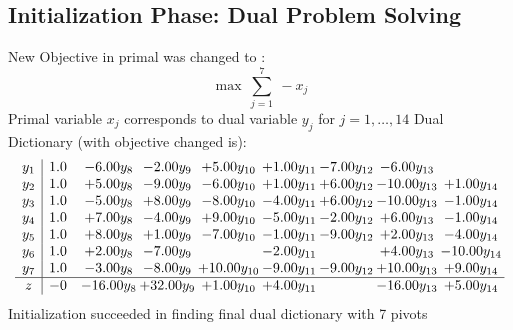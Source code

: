 \documentclass[8pt]{article}
\begin{document}
\subsection{Initialization Phase: Dual Problem Solving}
New Objective in primal was changed to : \[ \max\ \sum_{j=1}^{7}\ - x_j \] 
Primal variable $x_j$ corresponds to dual variable $y_j$ for $j = 1,\ldots,14$
Dual Dictionary (with objective changed is): 
\[\begin{array}{c| c c@{\hskip 2pt} c@{\hskip 2pt} c@{\hskip 2pt} c@{\hskip 2pt} c@{\hskip 2pt} c@{\hskip 2pt} c@{\hskip 2pt} }
 y_{1}   &  1.0 & -6.00 y_{8} & -2.00 y_{9} & +  5.00 y_{10} & +  1.00 y_{11} & -7.00 y_{12} & -6.00 y_{13} &   \\
 y_{2}   &  1.0 & +  5.00 y_{8} & -9.00 y_{9} & -6.00 y_{10} & +  1.00 y_{11} & +  6.00 y_{12} & -10.00 y_{13} & +  1.00 y_{14}\\
 y_{3}   &  1.0 & -5.00 y_{8} & +  8.00 y_{9} & -8.00 y_{10} & -4.00 y_{11} & +  6.00 y_{12} & -10.00 y_{13} & -1.00 y_{14}\\
 y_{4}   &  1.0 & +  7.00 y_{8} & -4.00 y_{9} & +  9.00 y_{10} & -5.00 y_{11} & -2.00 y_{12} & +  6.00 y_{13} & -1.00 y_{14}\\
 y_{5}   &  1.0 & +  8.00 y_{8} & +  1.00 y_{9} & -7.00 y_{10} & -1.00 y_{11} & -9.00 y_{12} & +  2.00 y_{13} & -4.00 y_{14}\\
 y_{6}   &  1.0 & +  2.00 y_{8} & -7.00 y_{9} &   & -2.00 y_{11} &   & +  4.00 y_{13} & -10.00 y_{14}\\
 y_{7}   &  1.0 & -3.00 y_{8} & -8.00 y_{9} & + 10.00 y_{10} & -9.00 y_{11} & -9.00 y_{12} & + 10.00 y_{13} & +  9.00 y_{14}\\
\hline
z    &  -0 & -16.00 y_{8} & + 32.00 y_{9} & +  1.00 y_{10} & +  4.00 y_{11} &   & -16.00 y_{13} & +  5.00 y_{14}\\
\end{array}\]
Initialization succeeded in finding final dual dictionary with 7 pivots
\end{document}
